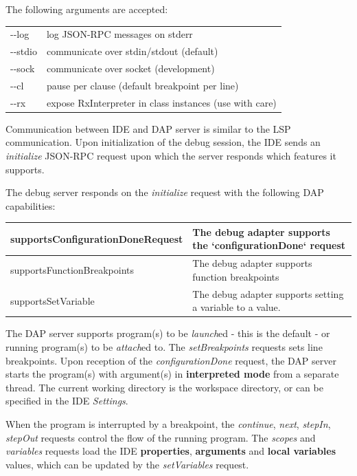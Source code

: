 The following arguments are accepted:

\begin{tabular}{ l l }
 -\/-log & log JSON-RPC messages on stderr \\
 -\/-stdio & communicate over stdin/stdout (default) \\
 -\/-sock  & communicate over socket (development) \\
 -\/-cl & pause per clause (default breakpoint per line) \\
 -\/-rx & expose RxInterpreter in class instances (use with care) \\
\end{tabular}

Communication between IDE and DAP server is similar to the LSP communication. Upon initialization of the debug session,
the IDE sends an \emph{initialize} JSON-RPC request upon which the server responds which features it supports.

The \nr{} debug server responds on the \emph{initialize} request with the following DAP capabilities:

\begin{tabular} { |p{8cm}|p{8cm}|  }
 \hline
 supportsConfigurationDoneRequest & The debug adapter supports the `configurationDone` request \\
 \hline
 supportsFunctionBreakpoints & The debug adapter supports function breakpoints \\
 \hline
 supportsSetVariable & The debug adapter supports setting a variable to a value.\\
 \hline
\end{tabular}


The DAP server supports program(s) to be \emph{launch}ed - this is the default - or running program(s) to be
\emph{attach}ed to.
The \emph{setBreakpoints} requests sets line breakpoints.
Upon reception of the \emph{configurationDone} request, the DAP server starts the program(s) with argument(s) in
\textbf{interpreted mode} from a separate thread. The current working directory is the workspace directory, or
can be specified in the IDE \emph{Settings}.

When the program is interrupted by a breakpoint, the \emph{continue}, \emph{next}, \emph{stepIn}, \emph{stepOut}
requests control the flow of the running program. The \emph{scopes} and \emph{variables} requests
load the IDE \textbf{properties}, \textbf{arguments} and \textbf{local variables} values,
which can be updated by the \emph{setVariables} request.

